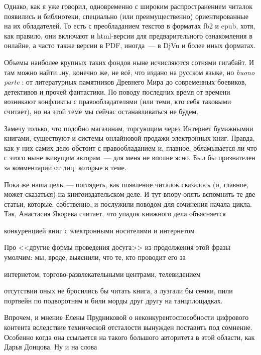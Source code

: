 Однако, как я уже говорил, одновременно с широким распространением читалок появились и библиотеки, специально (или преимущественно) ориентированные на их обладателей. То есть с преобладанием текстов в форматах fb2 и epub, хотя, как правило, они включают и html-версии для предварительного ознакомления в онлайне, а часто также версии в PDF, иногда~--- в DjVu и более иных форматах.

Объемы наиболее крупных таких фондов ныне исчисляются сотнями гигабайт. И там можно найти\dots ну, конечно же, не всё, что издано на русском языке, но 
\textit{buono parte}
: от литературных памятников Древнего Мира до современных боевиков, детективов и прочей фантастики. По поводу последних время от времени возникают конфликты с правообладателями (или теми, кто себя таковыми считает), но на этой теме мы сейчас останавливаться не будем.

Замечу только, что подобно магазинам, торгующим через Интернет бумажнымии книгами, существуют и системы онлайновой продажи электронных книг. Правда, как у них самих дело обстоит с правообладанием и, главное, обламывается ли что с этого ныне живущим авторам~--- для меня не вполне ясно. Был бы признателен за комментарии от лиц, которые в теме.

Пока же наша цель~--- поглядеть, как появление читалок сказалось (и, главное, может сказаться) на книгоиздательском деле. И тут впору опять вспомнить те две статьи, которые, собственно, и послужили поводом для сочинения начала цикла. Так, Анастасия Якорева считает, что упадок книжного дела объясняется


\begin{shadequote}{}
конкуренцией книг с электронными носителями и интернетом
\end{shadequote}

Про <<другие формы проведения досуга>> из продолжения этой фразы умолчим: мы, вроде, выяснили, что те, кто проводит его за


\begin{shadequote}{}
интернетом, торгово-развлекательными центрами, телевидением
\end{shadequote}

 отсутствии оных не бросились бы читать книга, а лузгали бы семки, пили портвейн по подворотням и били морды друг другу на танцплощадках.

Впрочем, и мнение Елены Прудниковой о неконкурентоспособности цифрового контента вследствие технической отсталости вынужден поставить под сомнение. Особенно когда она ссылается на такого большого авторитета в этой области, как Дарья Донцова. Ну и на слова


